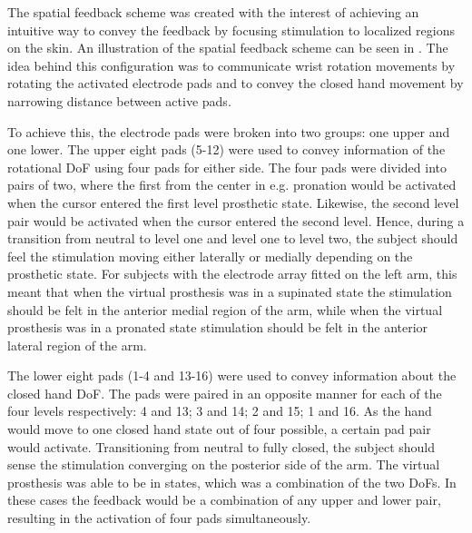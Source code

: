 The spatial feedback scheme was created with the interest of achieving an intuitive way to convey the feedback by focusing stimulation to localized regions on the skin. An illustration of the spatial feedback scheme can be seen in . The idea behind this configuration was to communicate wrist rotation movements by rotating the activated electrode pads and to convey the closed hand movement by narrowing distance between active pads. 

To achieve this, the electrode pads were broken into two groups: one upper and one lower. The upper eight pads (5-12) were used to convey information of the rotational DoF using four pads for either side.  The four pads were divided into pairs of two, where the first from the center in e.g. pronation would be activated when the cursor entered the first level prosthetic state. Likewise, the second level pair would be activated when the cursor entered the second level. Hence, during a transition from neutral to level one and level one to level two, the subject should feel the stimulation moving either laterally or medially depending on the prosthetic state. For subjects with the electrode array fitted on the left arm, this meant that when the virtual prosthesis was in a supinated state the stimulation should be felt in the anterior medial region of the arm, while when the virtual prosthesis was in a pronated state stimulation should be felt in the anterior lateral region of the arm.   

The lower eight pads (1-4 and 13-16) were used to convey information about the closed hand DoF. The pads were paired in an opposite manner for each of the four levels respectively: 4 and 13; 3 and 14; 2 and 15; 1 and 16. As the hand would move to one closed hand state out of four possible, a certain pad pair would activate. Transitioning from neutral to fully closed, the subject should sense the stimulation converging on the posterior side of the arm. The virtual prosthesis was able to be in states, which was a combination of the two DoFs. In these cases the feedback would be a combination of any upper and lower pair, resulting in the activation of four pads simultaneously. %

